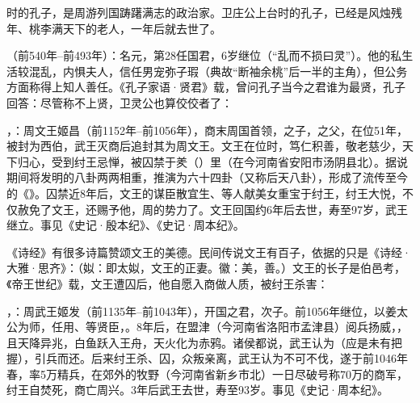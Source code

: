 时的孔子，是周游列国踌躇满志的政治家。卫庄公上台时的孔子，已经是风烛残年、桃李满天下的老人，一年后就去世了。

（前540年--前493年）：名元，第28任国君，6岁继位（“乱而不损曰灵”）。他的私生活较混乱，内惧夫人，信任男宠弥子瑕（典故“断袖余桃”后一半的主角），但公务方面称得上知人善任。《孔子家语·贤君》载，曾问孔子当今之君谁为最贤，孔子回答：尽管称不上贤，卫灵公也算佼佼者了：

，：周文王姬昌（前1152年--前1056年），商末周国首领，之子，之父，在位51年，被封为西伯，武王灭商后追封其为周文王。文王在位时，笃仁积善，敬老慈少，天下归心，受到纣王忌惮，被囚禁于羑（）里（在今河南省安阳市汤阴县北）。据说期间将发明的八卦两两相重，推演为六十四卦（又称后天八卦），形成了流传至今的《》。囚禁近8年后，文王的谋臣散宜生、等人献美女重宝于纣王，纣王大悦，不仅赦免了文王，还赐予他，周的势力了。文王回国约6年后去世，寿至97岁，武王继立。事见《史记·殷本纪》、《史记·周本纪》。

《诗经》有很多诗篇赞颂文王的美德。民间传说文王有百子，依据的只是《诗经·大雅·思齐》：（姒：即太姒，文王的正妻。徽：美，善。）文王的长子是伯邑考，《帝王世纪》载，文王遭囚后，他自愿入商做人质，被纣王杀害： %

，：周武王姬发（前1135年--前1043年），开国之君，次子。前1056年继位，以姜太公为师，任用、等贤臣，。8年后，在盟津（今河南省洛阳市孟津县）阅兵扬威，，且天降异兆，白鱼跃入王舟，天火化为赤鸦。诸侯都说，武王认为（应是未有把握），引兵而还。后来纣王杀、囚，众叛亲离，武王认为不可不伐，遂于前1046年春，率5万精兵，在郊外的牧野（今河南省新乡市北）一日尽破号称70万的商军，纣王自焚死，商亡周兴。3年后武王去世，寿至93岁。事见《史记·周本纪》。

